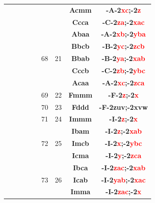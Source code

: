 \documentclass{article}      %
\begin{document}
\begin{small}
\begin{longtable}[c]{|c|c|c|c|c|c|c|c|c|}
          &  & & & &  & &\textbf{Acmm}         &\textbf{-A-2\textcolor{red}{xc};-2\textcolor{red}{z}}\\\cline{6-9}        
          &  & & & &  & &\textbf{Ccca}         &\textbf{-C-2\textcolor{red}{za};-2\textcolor{red}{xac}}\\\cline{8-9}      
          &  & & & &  & &\textbf{Abaa}         &\textbf{-A-2\textcolor{red}{xb};-2\textcolor{red}{yba}}\\\cline{8-9}      
          &  & & & &  & &\textbf{Bbcb}         &\textbf{-B-2\textcolor{red}{yc};-2\textcolor{red}{zcb}}\\\cline{8-9}      
	  &  & & & &\textrm{68}  &\textrm{21} &\textbf{Bbab}         &\textbf{-B-2\textcolor{red}{ya};-2\textcolor{red}{xab}}\\\cline{8-9}      
          &  & & & &  & &\textbf{Cccb}         &\textbf{-C-2\textcolor{red}{zb};-2\textcolor{red}{ybc}}\\\cline{8-9}      
          &  & & & &  & &\textbf{Acaa}         &\textbf{-A-2\textcolor{red}{xc};-2\textcolor{red}{zca}}\\\cline{6-9}      
	  &  & & & &\textrm{69}  &\textrm{22} &\textbf{Fmmm}         &\textbf{-F-2\textcolor{red}{z};-2\textcolor{red}{x}}\\\cline{6-9}         
	  &  & & & &\textrm{70}  &\textrm{23} &\textbf{Fddd}         &\textbf{-F-2zuv;-2xvw}\\\cline{6-9}     
	  &  & & & &\textrm{71}  &\textrm{24} &\textbf{Immm}         &\textbf{-I-2\textcolor{red}{z};-2\textcolor{red}{x}}\\\cline{6-9}         
          &  & & & &  & &\textbf{Ibam}         &\textbf{-I-2\textcolor{red}{z};-2\textcolor{red}{xab}}\\\cline{8-9}       
	  &  & & & &\textrm{72}  &\textrm{25} &\textbf{Imcb}         &\textbf{-I-2\textcolor{red}{x};-2\textcolor{red}{ybc}}\\\cline{8-9}       
          &  & & & &  & &\textbf{Icma}         &\textbf{-I-2\textcolor{red}{y};-2\textcolor{red}{zca}}\\\cline{6-9}       
          &  & & & &  & &\textbf{Ibca}         &\textbf{-I-2\textcolor{red}{zac};-2\textcolor{red}{xab}}\\\cline{8-9}     
	  &  & & & &\textrm{73}  &\textrm{26} &\textbf{Icab}         &\textbf{-I-2\textcolor{red}{yab};-2\textcolor{red}{xac}}\\\cline{6-9}     
          &  & & & &  & &\textbf{Imma}         &\textbf{-I-2\textcolor{red}{zac};-2\textcolor{red}{x}}\\\cline{8-9}       

\end{longtable}
\end{small}
\end{document}
